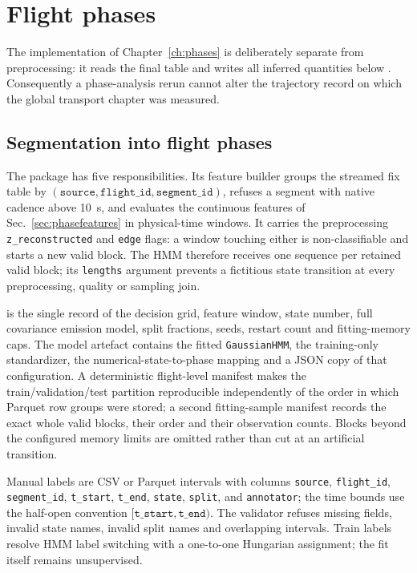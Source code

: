 \chapter{Flight phases}
\label{impl:phases}
The implementation of Chapter~\ref{ch:phases} is deliberately separate from preprocessing:
it reads the final  table and writes all inferred quantities below
. Consequently a phase-analysis rerun cannot alter the
trajectory record on which the global transport chapter was measured.

\section{Segmentation into flight phases}
\label{impl:segmentation}
The package  has five responsibilities. Its feature
builder groups the streamed fix table by $(\texttt{source},\texttt{flight\_id},
\texttt{segment\_id})$, refuses a segment with native cadence above \SI{10}{\second},
and evaluates the continuous features of Sec.~\ref{sec:phasefeatures} in physical-time
windows. It carries the preprocessing \texttt{z\_reconstructed} and \texttt{edge} flags:
a window touching either is non-classifiable and starts a new valid block. The HMM
therefore receives one sequence per retained valid block; its \texttt{lengths} argument
prevents a fictitious state transition at every preprocessing, quality or sampling join.

 is the single record of the decision grid, feature
window, state number, full covariance emission model, split fractions, seeds, restart
count and fitting-memory caps. The model artefact contains the fitted \texttt{GaussianHMM},
the training-only standardizer, the numerical-state-to-phase mapping and a JSON copy of
that configuration. A deterministic flight-level manifest makes the train/validation/test
partition reproducible independently of the order in which Parquet row groups were stored;
a second fitting-sample manifest records the exact whole valid blocks, their order and
their observation counts. Blocks beyond the configured memory limits are omitted rather
than cut at an artificial transition.

Manual labels are CSV or Parquet intervals with columns
\texttt{source}, \texttt{flight\_id}, \texttt{segment\_id}, \texttt{t\_start},
\texttt{t\_end}, \texttt{state}, \texttt{split}, and \texttt{annotator}; the time
bounds use the half-open convention $[\texttt{t\_start},\texttt{t\_end})$. The validator
refuses missing fields, invalid state names, invalid split names and overlapping intervals.
Train labels resolve HMM label switching with a one-to-one Hungarian assignment; the fit
itself remains unsupervised.

